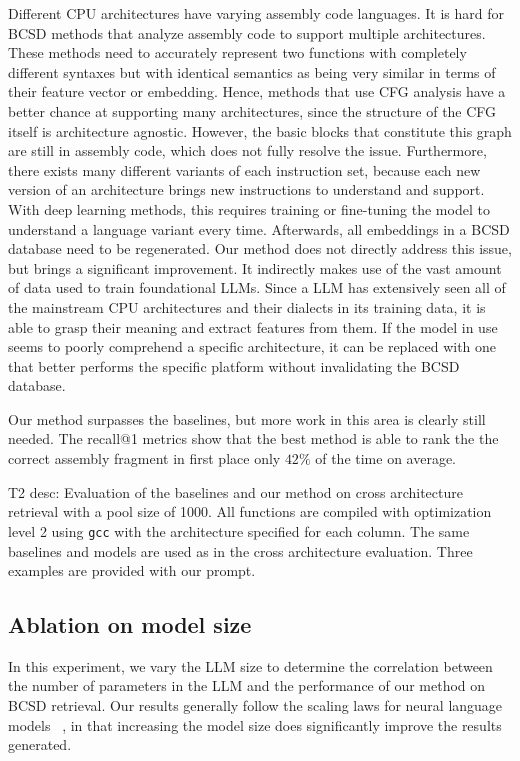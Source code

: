 \documentclass[conference,compsoc]{IEEEtran}
\begin{document}
Different CPU architectures have varying assembly code languages. It is hard for BCSD methods that analyze assembly code to support
multiple architectures. These methods need to accurately represent two functions with completely different syntaxes but with identical
semantics as being very similar in terms of their feature vector or embedding. Hence, methods that use CFG analysis have a better chance
at supporting many architectures, since the structure of the CFG itself is architecture agnostic. However, the basic blocks that constitute
this graph are still in assembly code, which does not fully resolve the issue. Furthermore, there exists many different variants of each
instruction set, because each new version of an architecture brings new instructions to understand and support. With deep learning methods,
this requires training or fine-tuning the model to understand a language variant every time. Afterwards, all embeddings in a BCSD database need to
be regenerated. Our method does not directly address this issue, but brings a significant improvement. It indirectly makes use of the vast
amount of data used to train foundational LLMs. Since a LLM has extensively seen all of the mainstream CPU architectures and their dialects
in its training data, it is able to grasp their meaning and extract features from them. If the model in use seems to poorly comprehend a
specific architecture, it can be replaced with one that better performs the specific platform without invalidating the BCSD database.

Our method surpasses the baselines, but more work in this area is clearly still needed. The recall@1 metrics show that the best method
is able to rank the the correct assembly fragment in first place only \(42\%\) of the time on average.

T2 desc: Evaluation of the baselines and our method on cross architecture retrieval with a pool size of 1000.
All functions are compiled with optimization level 2 using \texttt{gcc} with the architecture specified for each column.
The same baselines and models are used as in the cross architecture evaluation. Three examples are provided with our prompt.

\subsection{Ablation on model size}

In this experiment, we vary the LLM size to determine the correlation between the number of parameters in the LLM and the performance
of our method on BCSD retrieval. Our results generally follow the scaling laws for neural language models ~\cite{scaling-laws}, in that increasing
the model size does significantly improve the results generated.
\end{document}
